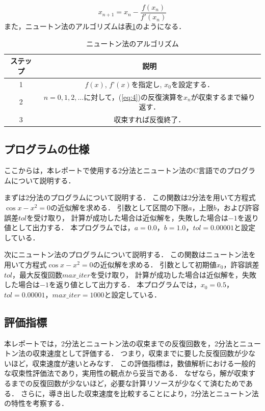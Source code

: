 \documentclass[uplatex]{jsarticle}
\begin{document}
\begin{equation}
x_{n+1} = x_n - \frac{f(x_n)}{f'(x_n)}\label{eq:4}
\end{equation}
また，ニュートン法のアルゴリズムは表\ref{tab:2}のようになる．
\begin{table}[H]
	\centering
	\caption{ニュートン法のアルゴリズム}
	\begin{tabular}{|c|c|}
		\hline
		\textbf{ステップ} & \textbf{説明} \\
		\hline
		1 & $f(x)$, $f’(x)$を指定し, $x_0$を設定する．\\
		\hline
		2 & $n=0,1,2,…$に対して，(\ref{eq:4})の反復演算を$x_n$が収束するまで繰り返す． \\
		\hline
		3 & 収束すれば反復終了． \\
		\hline
	\end{tabular}
	\label{tab:2}
\end{table}

\subsection{プログラムの仕様}
\indent
ここからは，本レポートで使用する2分法とニュートン法のC言語でのプログラムについて説明する．
\par

まずは2分法のプログラムについて説明する．
この関数は2分法を用いて方程式$\cos x - x^2 = 0$の近似解を求める．
引数として区間の下限$a$，上限$b$，および許容誤差$tol$を受け取り，
計算が成功した場合は近似解を，失敗した場合は$-1$を返り値として出力する．
本プログラムでは，$a=0.0$，$b=1.0$，$tol=0.00001$と設定している．
\par

次にニュートン法のプログラムについて説明する．
この関数はニュートン法を用いて方程式$\cos x - x^2 = 0$の近似解を求める．
引数として初期値$x_0$，許容誤差$tol$，最大反復回数$max\_iter$を受け取り，
計算が成功した場合は近似解を，失敗した場合は$-1$を返り値として出力する．
本プログラムでは，$x_0=0.5$，$tol=0.00001$，$max\_iter=1000$と設定している．


\subsection{評価指標}
\indent
本レポートでは，2分法とニュートン法の収束までの反復回数を，2分法とニュートン法の収束速度として評価する．
つまり，収束までに要した反復回数が少ないほど，収束速度が速いとみなす．
この評価指標は，数値解析における一般的な収束性評価法であり\cite{ref7}，実用性の観点から妥当である．
なぜなら，解が収束するまでの反復回数が少ないほど，必要な計算リソースが少なくて済むためである．
さらに，導き出した収束速度を比較することにより，2分法とニュートン法の特性を考察する．
\end{document}
